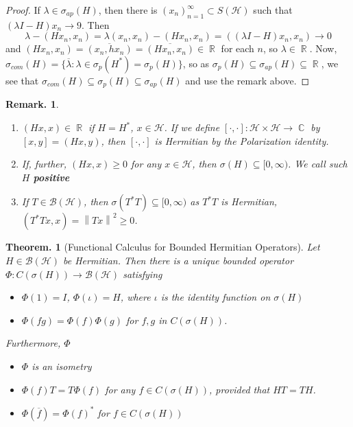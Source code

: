 \documentclass[11pt, a4paper]{memoir}
\DeclareMathOperator{\R}{{\mathbb{R}}}
\DeclareMathOperator{\C}{{\mathbb{C}}}
\newcommand{\norm}[1]{\ensuremath{\left\lVert#1\right\rVert}}
\theoremstyle{change}
\newtheorem{theorem}{Theorem.}[section]
\theoremstyle{plain}
\theoremstyle{nonumberplain}
\newtheorem{remark}{Remark.}
\newtheorem{proof}{Proof}
\newcommand{\inr}[1]{\ensuremath{\left(#1\right)}}
\numberwithin{equation}{section}
\begin{document}
\begin{proof}
    If $\lambda\in\sigma_{ap}(H)$, then there is $(x_n)_{n=1}^\infty\subset S(\mathcal{H})$ such that $(\lambda I-H)x_n\to 9$.
    Then
    \begin{equation*}
        \lambda-\inr{Hx_n,x_n}=\lambda\inr{x_n,x_n}-\inr{Hx_n,x_n}=\inr{(\lambda I-H)x_n,x_n}\to 0
    \end{equation*}
    and $\inr{Hx_n,x_n}=\overline{\inr{x_n,hx_n}}=\overline{\inr{Hx_n,x_n}}\in\R$ for each $n$, so $\lambda\in\R$.
    Now, $\sigma_{com}(H)=\{\overline{\lambda}:\lambda\in\sigma_p(H^*)=\sigma_p(H)\}$, so as $\sigma_p(H)\subseteq\sigma_{ap}(H)\subseteq\R$, we see that $\sigma_{com}(H)\subseteq\sigma_p(H)\subseteq\sigma_{ap}(H)$ and use the remark above.
\end{proof}
\begin{remark}
    \begin{enumerate}[nl,r]
        \item $\inr{Hx,x}\in\R$ if $H=H^*$, $x\in\mathcal{H}$.
            If we define $[\cdot,\cdot]:\mathcal{H}\times\mathcal{H}\to\C$ by $[x,y]=\inr{Hx,y}$, then $[\cdot,\cdot]$ is Hermitian by the Polarization identity.
        \item If, further, $\inr{Hx,x}\geq 0$ for any $x\in\mathcal{H}$, then $\sigma(H)\subseteq[0,\infty)$.
            We call such $H$ \textbf{positive}
        \item If $T\in\mathcal{B}(\mathcal{H})$, then $\sigma(T^*T)\subseteq[0,\infty)$ as $T^*T$ is Hermitian, $\inr{T^*Tx,x}=\norm{Tx}^2\geq 0$.
    \end{enumerate}
\end{remark}
\begin{theorem}[Functional Calculus for Bounded Hermitian Operators]
    Let $H\in\mathcal{B}(\mathcal{H})$ be Hermitian.
    Then there is a unique bounded operator $\Phi:C(\sigma(H))\to\mathcal{B}(\mathcal{H})$ satisfying
    \begin{itemize}[nl]
        \item $\Phi(1)=I$, $\Phi(\iota)=H$, where $\iota$ is the identity function on $\sigma(H)$
        \item $\Phi(fg)=\Phi(f)\Phi(g)$ for $f,g$ in $C(\sigma(H))$.
    \end{itemize}
    Furthermore, $\Phi$
    \begin{itemize}[nl]
        \item $\Phi$ is an isometry
        \item $\Phi(f)T=T\Phi(f)$ for any $f\in C(\sigma(H))$, provided that $HT=TH$.
        \item $\Phi(\overline{f})=\Phi(f)^*$ for $f\in C(\sigma(H))$
    \end{itemize}
\end{theorem}
\end{document}
